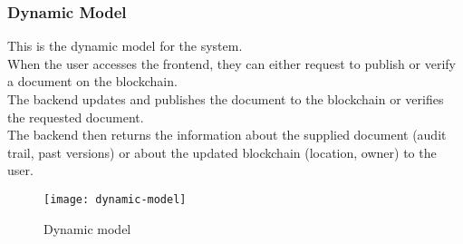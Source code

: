\newpage
\subsubsection{Dynamic Model}
This is the dynamic model for the system. \\
When the user accesses the frontend, they can either request to 
publish or verify a document on the blockchain. \\
The backend updates and publishes the document to 
the blockchain or verifies the requested document. \\
The backend then returns the information about the supplied 
document (audit trail, past versions) or about the updated 
blockchain (location, owner) to the user. 

\begin{figure}[h]
\centering %
\texttt{[image: dynamic-model]} 
\caption{Dynamic model}
\label{fig: dynamic-model} %
\end{figure}
\newpage
